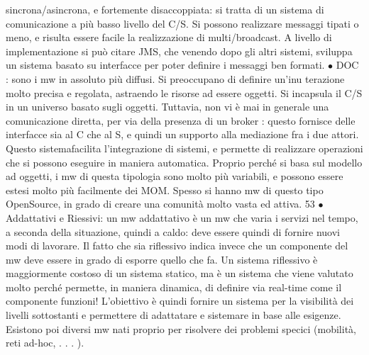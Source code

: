sincrona/asincrona, e fortemente disaccoppiata: si tratta di un sistema di
comunicazione a più basso livello del C/S. Si possono realizzare messaggi
tipati o meno, e risulta essere facile la realizzazione di multi/broadcast.
A livello di implementazione si può citare JMS, che venendo dopo gli
altri sistemi, sviluppa un sistema basato su interfacce per poter definire i
messaggi ben formati.
$\bullet$ DOC : sono i mw in assoluto più diffusi. Si preoccupano di definire un'inu
terazione molto precisa e regolata, astraendo le risorse ad essere oggetti.
Si incapsula il C/S in un universo basato sugli oggetti. Tuttavia, non vi
è mai in generale una comunicazione diretta, per via della presenza di un
broker : questo fornisce delle interfacce sia al C che al S, e quindi un supporto alla mediazione fra i due attori.
Questo sistemafacilita l'integrazione
di sistemi, e permette di realizzare operazioni che si possono eseguire in
maniera automatica.
Proprio perché si basa sul modello ad oggetti, i mw di questa tipologia
sono molto più variabili, e possono essere estesi molto più facilmente dei
MOM. Spesso si hanno mw di questo tipo OpenSource, in grado di creare
una comunità molto vasta ed attiva.
53
$\bullet$ Addattativi e Riessivi: un mw addattativo è un mw che varia i servizi
nel tempo, a seconda della situazione, quindi a caldo: deve essere quindi
di fornire nuovi modi di lavorare.
Il fatto che sia riflessivo indica invece che un componente del mw deve essere in grado di esporre quello che fa. Un
sistema riflessivo è maggiormente
costoso di un sistema statico, ma è un sistema che viene valutato molto
perché permette, in maniera dinamica, di definire via real-time come il
componente funzioni!
L'obiettivo è quindi fornire un sistema per la visibilità dei livelli sottostanti
e permettere di adattatare e sistemare in base alle esigenze.
Esistono poi diversi mw nati proprio per risolvere dei problemi specici (mobilità, reti ad-hoc, . . . ).
